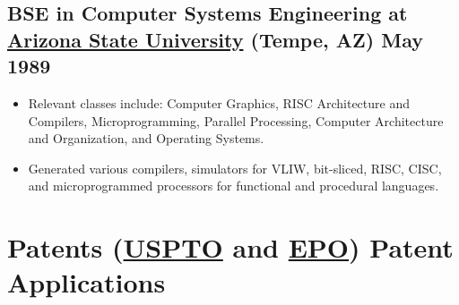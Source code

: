 \documentclass[10pt,letterpaper,oneside]{report}
\begin{document}
\medskip

\begin{minipage}{\textwidth}
  \subsection[BSE in Computer Systems Engineering]{
    BSE in Computer Systems Engineering at \href{https://engineering.asu.edu/undergraduate-degree-programs}{Arizona State University}
    {\small (Tempe, AZ)}
    \hfill
    May 1989
  }

  \begin{itemize}
    \item Relevant classes include: Computer Graphics, RISC Architecture and Compilers, Microprogramming, Parallel Processing, Computer Architecture and Organization, and Operating Systems.

    \item Generated various compilers, simulators for VLIW, bit-sliced, RISC, CISC, and microprogrammed processors for functional and procedural languages.
  \end{itemize}
\end{minipage}

\section[Patents (USPTO and EPO) and Patent Applications]{Patents
(\href{http://patft.uspto.gov/netacgi/nph-Parser?Sect1=PTO2&Sect2=HITOFF&p=1&u=/netahtml/PTO/search-bool.html&r=0&f=S&l=50&TERM1=voltz&FIELD1=INNM&co1=AND&TERM2=christopher&FIELD2=INNM&d=PTXT}{USPTO}
and
\href{http://v3.espacenet.com/searchResults?locale=en_EP&ST=quick&IA=voltz+christopher&compact=false&DB=EPODOC&submitted=true}{EPO})
{Patent Applications}}
\end{document}
